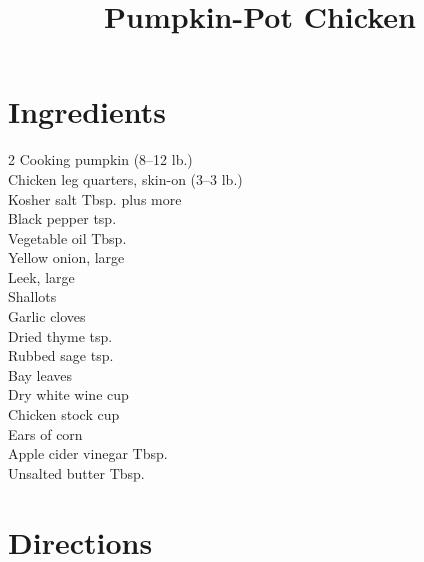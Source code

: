 \documentclass[11pt,letterpaper]{article}
\title{Pumpkin-Pot Chicken}
\author{}
\date{}
\begin{document}
\maketitle
\thispagestyle{empty}

 

\section*{Ingredients}
\setlength{\columnsep}{20pt}
\begin{multicols}{2}
\noindent
    Cooking pumpkin  (8--12 lb.) \\
    Chicken leg quarters, skin-on  (3--3 lb.) \\
    Kosher salt  Tbsp. plus more \\
    Black pepper  tsp. \\
    Vegetable oil  Tbsp. \\
    Yellow onion, large  \\
    Leek, large  \\
    Shallots  \\
    \columnbreak
    Garlic cloves  \\
    Dried thyme  tsp. \\
    Rubbed sage \dotfill {} tsp. \\
    Bay leaves  \\
    Dry white wine \dotfill {} cup \\
    Chicken stock  cup \\
    Ears of corn  \\
    Apple cider vinegar  Tbsp. \\
    Unsalted butter  Tbsp. \\
\end{multicols}

\section*{Directions}
\end{document}
